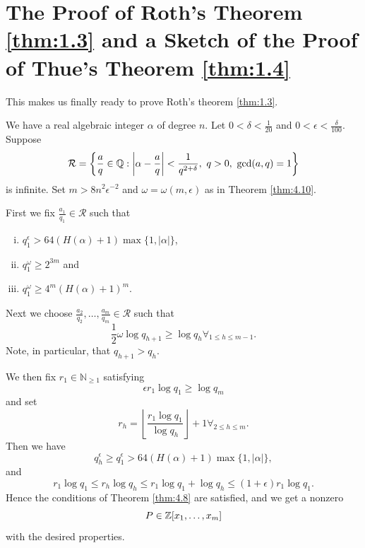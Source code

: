 \documentclass{Vorlesungstemplate_English} %
\renewcommand{\N}{\mathbb{N}_{\geq 1}}
\begin{document}
\section{The Proof of Roth's Theorem \ref{thm:1.3} and a Sketch of the Proof of Thue's Theorem \ref{thm:1.4}}
\noindent This makes us finally ready to prove Roth's theorem \ref{thm:1.3}.
\begin{pf}
  We have a real algebraic integer $\alpha$ of degree $n$. Let $0<\delta<\frac{1}{20}$ and $0<\epsilon<\frac{\delta}{100}$. Suppose
  \[
    \mathcal R=
    \left\{
      \frac aq\in\mathbb{Q}:
      \left|\alpha-\frac aq\right|<\frac{1}{q^{2+\delta}},
      \ q>0,\ \gcd(a,q)=1
    \right\}
  \]
  is infinite. Set $m>8n^2\epsilon^{-2}$ and $\omega=\omega(m,\epsilon)$ as in Theorem \ref{thm:4.10}.

  First we fix $\frac{a_1}{q_1}\in\mathcal R$ such that
  \begin{enumerate}[(i)]
    \item $q_1^\epsilon>64(H(\alpha)+1)\max\{1,|\alpha|\}$,
    \item $q_1^\omega\geq 2^{3m}$ and
    \item $q_1^\omega\geq 4^m(H(\alpha)+1)^m$.
  \end{enumerate}
  Next we choose $\frac{a_2}{q_2},\dots,\frac{a_m}{q_m}\in\mathcal R$ such that
  \[
    \frac12\omega\log q_{h+1}\geq \log q_h \forall_{1 \leq h \leq m-1}.
  \]
  Note, in particular, that $q_{h+1}>q_h$.

  We then fix $r_1\in\N$ satisfying
  \[
    \epsilon r_1\log q_1\geq \log q_m
  \]
  and set
  \[
    r_h=\left\lfloor\frac{r_1\log q_1}{\log q_h}\right\rfloor+1 \forall_{2 \leq h \leq m}.
  \]
  Then we have
  \[
    q_h^\epsilon\geq q_1^\epsilon>64(H(\alpha)+1)\max\{1,|\alpha|\},
  \]
  and
  \[
    r_1\log q_1\leq r_h\log q_h\leq r_1\log q_1+\log q_h\leq (1+\epsilon)r_1\log q_1.
  \]
  Hence the conditions of Theorem \ref{thm:4.8} are satisfied, and we get a nonzero
  \[
    P\in\mathbb{Z}[x_1,\dots,x_m]
  \]
  with the desired properties.


\end{pf}
\end{document}
